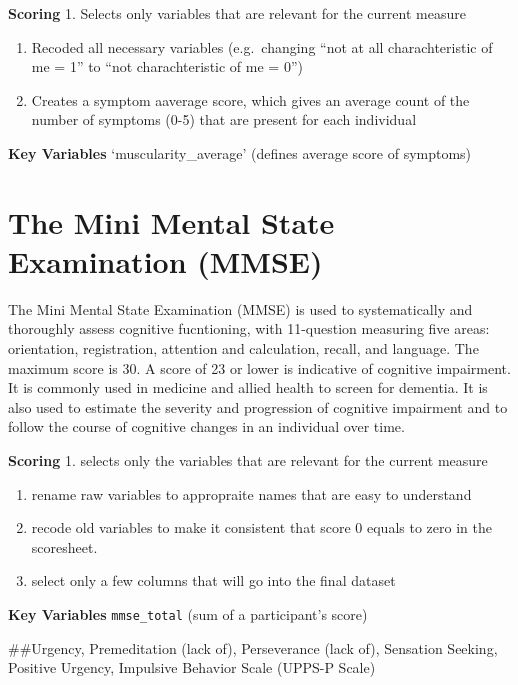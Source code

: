 \documentclass[
]{book}
\begin{document}
\textbf{Scoring}
1. Selects only variables that are relevant for the current measure

\begin{enumerate}
\def\labelenumi{\arabic{enumi}.}
\setcounter{enumi}{1}
\item
  Recoded all necessary variables (e.g.~changing ``not at all charachteristic of me = 1'' to ``not charachteristic of me = 0'')
\item
  Creates a symptom aaverage score, which gives an average count of the number of symptoms (0-5) that are present for each individual
\end{enumerate}

\textbf{Key Variables}
`muscularity\_average' (defines average score of symptoms)

\hypertarget{the-mini-mental-state-examination-mmse}{%
\section{The Mini Mental State Examination (MMSE)}\label{the-mini-mental-state-examination-mmse}}

The Mini Mental State Examination (MMSE) is used to systematically and thoroughly assess cognitive fucntioning, with 11-question measuring five areas: orientation, registration, attention and calculation, recall, and language. The maximum score is 30. A score of 23 or lower is indicative of cognitive impairment. It is commonly used in medicine and allied health to screen for dementia. It is also used to estimate the severity and progression of cognitive impairment and to follow the course of cognitive changes in an individual over time.

\textbf{Scoring}
1. selects only the variables that are relevant for the current measure

\begin{enumerate}
\def\labelenumi{\arabic{enumi}.}
\setcounter{enumi}{1}
\item
  rename raw variables to appropraite names that are easy to understand
\item
  recode old variables to make it consistent that score 0 equals to zero in the scoresheet.
\item
  select only a few columns that will go into the final dataset
\end{enumerate}

\textbf{Key Variables}
\texttt{mmse\_total} (sum of a participant's score)

\#\#Urgency, Premeditation (lack of), Perseverance (lack of), Sensation Seeking, Positive Urgency, Impulsive Behavior Scale (UPPS-P Scale)
\end{document}
